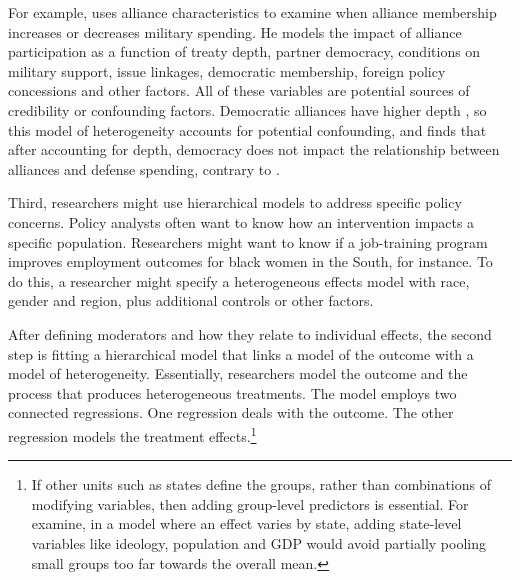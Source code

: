 \documentclass[12pt]{article}
\begin{document}
For example, \citet{Alley2021isq} uses alliance characteristics to examine when alliance membership increases or decreases military spending.
He models the impact of alliance participation as a function of treaty depth, partner democracy, conditions on military support, issue linkages, democratic membership, foreign policy concessions and other factors. 
All of these variables are potential sources of credibility or confounding factors.
Democratic alliances have higher depth \citep{Martin2005}, so this model of heterogeneity accounts for potential confounding, and finds that after accounting for depth, democracy does not impact the relationship between alliances and defense spending, contrary to \citet{DiGiuseppePoast2018}.


Third, researchers might use hierarchical models to address specific policy concerns.
Policy analysts often want to know how an intervention impacts a specific population. 
Researchers might want to know if a job-training program improves employment outcomes for black women in the South, for instance.  
To do this, a researcher might specify a heterogeneous effects model with race, gender and region, plus additional controls or other factors.




After defining moderators and how they relate to individual effects, the second step is fitting a hierarchical model that links a model of the outcome with a model of heterogeneity.
Essentially, researchers model the outcome and the process that produces heterogeneous treatments. 
The model employs two connected regressions.
One regression deals with the outcome.
The other regression models the treatment effects.\footnote{If other units such as states define the groups, rather than combinations of modifying variables, then adding group-level predictors is essential. For examine, in a model where an effect varies by state, adding state-level variables like ideology, population and GDP would avoid partially pooling small groups too far towards the overall mean.}
\end{document}
